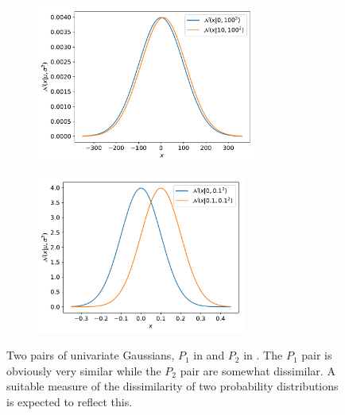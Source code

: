 \begin{figure}[tbp!]
    \begin{subfigure}[b]{0.50\textwidth}
        \centering
        \includegraphics[height=5.2cm]{graphics/gaussian-pdfs/S1.pdf}
        \caption{}
        \label{fig: Theory: gaussian-pdfs/S1}
    \end{subfigure}
    \hfill
    \begin{subfigure}[b]{0.48\textwidth}
        \centering
        \includegraphics[height=5.2cm]{graphics/gaussian-pdfs/S2.pdf}
        \caption{}
        \label{fig: Theory: gaussian-pdfs/S2}
    \end{subfigure}
    \caption{
        Two pairs of univariate Gaussians, $P_1$ in  and $P_2$ in . The $P_1$ pair is obviously very similar while the $P_2$ pair are somewhat dissimilar. A suitable measure of the dissimilarity of two probability distributions is expected to reflect this.
    }
    \label{fig: Theory: gaussian-pdfs}
\end{figure}

